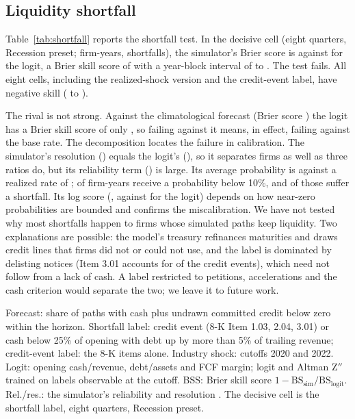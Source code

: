 \documentclass[preprint,12pt,authoryear]{elsarticle}
\begin{document}
\subsection{Liquidity shortfall}
Table~\ref{tab:shortfall} reports the shortfall test. In the decisive cell (eight quarters, Recession preset; \ShortN{} firm-years, \ShortEv{} shortfalls), the simulator's Brier score is \ShortBrierTwin{} against \ShortBrierLogit{} for the logit, a Brier skill score of \ShortBss{} with a year-block interval of \ShortBssLo{} to \ShortBssHi. The test fails. All eight cells, including the realized-shock version and the credit-event label, have negative skill (\ShortCellsMin{} to \ShortCellsMax).

The rival is not strong. Against the climatological forecast (Brier score \ShortClim) the logit has a Brier skill score of only \ShortLogitClimBss, so failing against it means, in effect, failing against the base rate. The decomposition locates the failure in calibration. The simulator's resolution (\ShortRes) equals the logit's (\ShortResLogit), so it separates firms as well as three ratios do, but its reliability term (\ShortRel) is large. Its average probability is \ShortMeanP{} against a realized rate of \ShortBase{}; \ShortLowBinShare{} of firm-years receive a probability below 10\%, and \ShortLowBinRate{} of those suffer a shortfall. Its log score (\ShortLogTwin, against \ShortLogLogit{} for the logit) depends on how near-zero probabilities are bounded and confirms the miscalibration. We have not tested why most shortfalls happen to firms whose simulated paths keep liquidity. Two explanations are possible: the model's treasury refinances maturities and draws credit lines that firms did not or could not use, and the label is dominated by delisting notices (Item 3.01 accounts for \CeEvDelist{} of the \CeEv{} credit events), which need not follow from a lack of cash. A label restricted to petitions, accelerations and the cash criterion would separate the two; we leave it to future work.

\begin{table}[t]
\centering\scriptsize
\setlength{\tabcolsep}{3pt}
\caption{Shortfall test: probability that cash plus undrawn credit falls below zero}
\label{tab:shortfall}
\resizebox{\linewidth}{!}{}
\par\smallskip
\begin{minipage}{\linewidth}\footnotesize
Forecast: share of paths with cash plus undrawn committed credit below zero within the horizon. Shortfall label: credit event (8-K Item 1.03, 2.04, 3.01) or cash below 25\% of opening with debt up by more than 5\% of trailing revenue; credit-event label: the 8-K items alone. Industry shock: cutoffs 2020 and 2022. Logit: opening cash/revenue, debt/assets and FCF margin; logit and Altman Z$''$ trained on labels observable at the cutoff. BSS: Brier skill score $1-\mathrm{BS}_{\text{sim}}/\mathrm{BS}_{\text{logit}}$. Rel./res.: the simulator's reliability and resolution \citep{murphy1973}. The decisive cell is the shortfall label, eight quarters, Recession preset.
\end{minipage}
\end{table}
\end{document}
